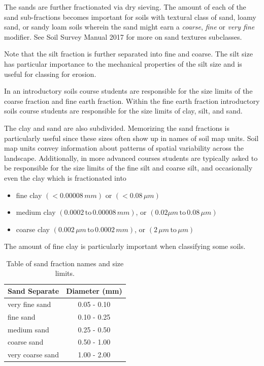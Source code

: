 \documentclass[a5paper]{report}
\begin{document}
The sands are further fractionated via dry sieving. The amount of each of the sand sub-fractions becomes important for soils with textural class of sand, loamy sand, or sandy loam soils wherein the sand might earn a \emph{coarse}, \emph{fine} or \emph{very fine} modifier. See Soil Survey Manual 2017 for more on sand textures subclasses.

Note that the silt fraction is further separated into fine and coarse. The silt size has particular importance to the mechanical properties of the silt size and is useful for classing for erosion.

In an introductory soils course students are responsible for the size limits of the coarse fraction and fine earth fraction. Within the fine earth fraction introductory soils course students are responsible for the size limits of clay, silt, and sand.

The clay and sand are also subdivided. Memorizing the sand fractions is particularly useful since these sizes often show up in names of soil map units. Soil map units convey information about patterns of spatial variability across the landscape. Additionally, in more advanced courses students are typically asked to be responsible for the size limits of the fine silt and coarse silt, and occasionally even the clay which is fractionated into
    
\begin{itemize}
    \item fine clay $\left( < 0.00008\, mm \right)$ or $\left( < 0.08\, \mu m \right)$
    \item medium clay $\left(0.0002\, \text{to}\, 0.00008\, mm \right)$, or $\left(0.02 \mu m\,\text{to}\,0.08\, \mu m \right)$
    \item coarse clay $\left(0.002\, \mu m\, \text{to}\, 0.0002\, mm\right)$, or $\left(2\, \mu m\,\text{to}\,\mu m \right)$
\end{itemize}
    
The amount of fine clay is particularly important when classifying some soils.
    
\begin{table}[!htbp]
\label{tab:sandfractions}
\centering
\caption{Table of sand fraction names and size limits.}
\begin{tabular}{|l|c|}
\hline
Sand Separate           &  Diameter (mm)\\
\hline \hline
very fine sand          & 0.05 - 0.10\\
fine sand               & 0.10 - 0.25\\
medium sand             & 0.25 - 0.50\\
coarse sand             & 0.50 - 1.00\\
very coarse sand        & 1.00 - 2.00\\
\hline
\end{tabular}
\end{table}
    
\end{document}

